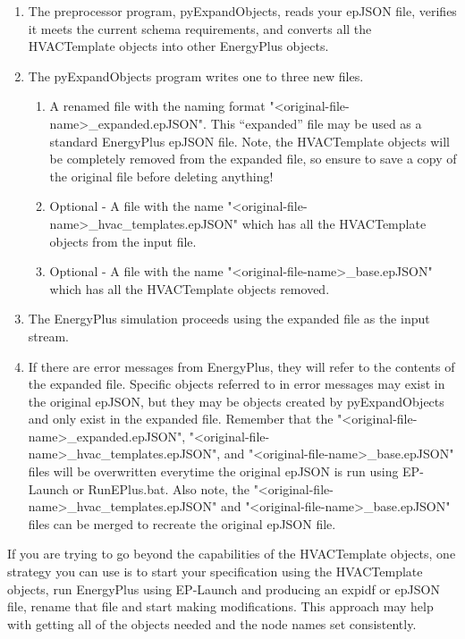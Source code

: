 \begin{enumerate}
\def\labelenumi{\arabic{enumi})}
\item
  The preprocessor program, pyExpandObjects, reads your epJSON file, verifies it meets the current schema requirements, and converts all the HVACTemplate objects into other EnergyPlus objects.
\item
  The pyExpandObjects program writes one to three new files.  
  \begin{enumerate}
  \item
    A renamed file with the naming format "<original-file-name>\_expanded.epJSON". This “expanded” file may be used as a standard EnergyPlus epJSON file.  Note, the HVACTemplate objects will be completely removed from the expanded file, so ensure to save a copy of the original file before deleting anything!
  \item
    Optional - A file with the name "<original-file-name>\_hvac\_templates.epJSON" which has all the HVACTemplate objects from the input file.
  \item
    Optional - A file with the name "<original-file-name>\_base.epJSON" which has all the HVACTemplate objects removed.
  \end{enumerate}
  \item
    The EnergyPlus simulation proceeds using the expanded file as the input stream.
  \item
    If there are error messages from EnergyPlus, they will refer to the contents of the expanded file. Specific objects referred to in error messages may exist in the original epJSON, but they may be objects created by pyExpandObjects and only exist in the expanded file. Remember that the "<original-file-name>\_expanded.epJSON", "<original-file-name>\_hvac\_templates.epJSON", and "<original-file-name>\_base.epJSON" files will be overwritten everytime the original epJSON is run using EP-Launch or RunEPlus.bat.  Also note, the "<original-file-name>\_hvac\_templates.epJSON" and "<original-file-name>\_base.epJSON" files can be merged to recreate the original epJSON file.
\end{enumerate}

If you are trying to go beyond the capabilities of the HVACTemplate objects, one strategy you can use is to start your specification using the HVACTemplate objects, run EnergyPlus using EP-Launch and producing an expidf or epJSON file, rename that file and start making modifications. This approach may help with getting all of the objects needed and the node names set consistently.


